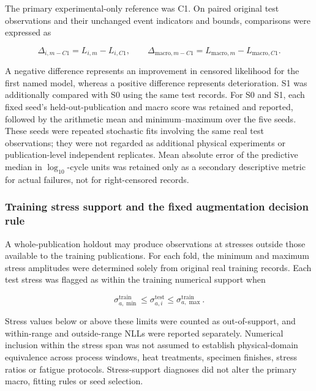 \documentclass[12pt,a4paper]{article}
\begin{document}
The primary experimental-only reference was C1. On paired original test observations and their unchanged event indicators and bounds, comparisons were expressed as

\begin{equation}
\Delta_{i,m-C1}=L_{i,m}-L_{i,C1},
\qquad
\Delta_{\mathrm{macro},m-C1}
=L_{\mathrm{macro},m}-L_{\mathrm{macro},C1}.
\tag{2.6c}
\end{equation}

A negative difference represents an improvement in censored likelihood for the first named model, whereas a positive difference represents deterioration. S1 was additionally compared with S0 using the same test records. For S0 and S1, each fixed seed's held-out-publication and macro score was retained and reported, followed by the arithmetic mean and minimum–maximum over the five seeds. These seeds were repeated stochastic fits involving the same real test observations; they were not regarded as additional physical experiments or publication-level independent replicates. Mean absolute error of the predictive median in \(\log_{10}\)-cycle units was retained only as a secondary descriptive metric for actual failures, not for right-censored records.

\subsubsection{Training stress support and the fixed augmentation decision rule}

A whole-publication holdout may produce observations at stresses outside those available to the training publications. For each fold, the minimum and maximum stress amplitudes were determined solely from original real training records. Each test stress was flagged as within the training numerical support when

\begin{equation}
\sigma_{a,\min}^{\mathrm{train}}
\leq \sigma_{a,i}^{\mathrm{test}}
\leq \sigma_{a,\max}^{\mathrm{train}}.
\tag{2.6d}
\end{equation}

Stress values below or above these limits were counted as out-of-support, and within-range and outside-range NLLs were reported separately. Numerical inclusion within the stress span was not assumed to establish physical-domain equivalence across process windows, heat treatments, specimen finishes, stress ratios or fatigue protocols. Stress-support diagnoses did not alter the primary macro, fitting rules or seed selection.
\end{document}
